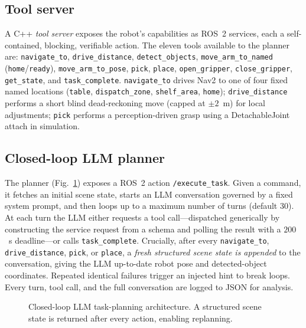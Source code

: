 \documentclass[conference]{IEEEtran}
\begin{document}
\subsection{Tool server}
A C++ \emph{tool server} exposes the robot's capabilities as ROS~2 services, each
a self-contained, blocking, verifiable action. The eleven tools available to the
planner are: \texttt{navigate\_to}, \texttt{drive\_distance},
\texttt{detect\_objects}, \texttt{move\_arm\_to\_named} (\texttt{home}/\texttt{ready}),
\texttt{move\_arm\_to\_pose}, \texttt{pick}, \texttt{place},
\texttt{open\_gripper}, \texttt{close\_gripper}, \texttt{get\_state}, and
\texttt{task\_complete}. \texttt{navigate\_to} drives Nav2 to one of four fixed
named locations (\texttt{table}, \texttt{dispatch\_zone}, \texttt{shelf\_area},
\texttt{home}); \texttt{drive\_distance} performs a short blind dead-reckoning
move (capped at $\pm2$~m) for local adjustments; \texttt{pick} performs a
perception-driven grasp using a DetachableJoint attach in simulation.

\subsection{Closed-loop LLM planner}
The planner (Fig.~\ref{fig:loop}) exposes a ROS~2 action \texttt{/execute\_task}.
Given a command, it fetches an initial scene state, starts an LLM conversation
governed by a fixed system prompt, and then loops up to a maximum number of turns
(default $30$). At each turn the LLM either requests a tool call---dispatched
generically by constructing the service request from a schema and polling the
result with a $200$~s deadline---or calls \texttt{task\_complete}. Crucially,
after every \texttt{navigate\_to}, \texttt{drive\_distance}, \texttt{pick}, or
\texttt{place}, a \emph{fresh structured scene state is appended} to the
conversation, giving the LLM up-to-date robot pose and detected-object
coordinates. Repeated identical failures trigger an injected hint to break loops.
Every turn, tool call, and the full conversation are logged to JSON for analysis.

\begin{figure}[t]
\centering
\caption{Closed-loop LLM task-planning architecture. A structured scene state is
returned after every action, enabling replanning.}
\label{fig:loop}
\end{figure}
\end{document}
